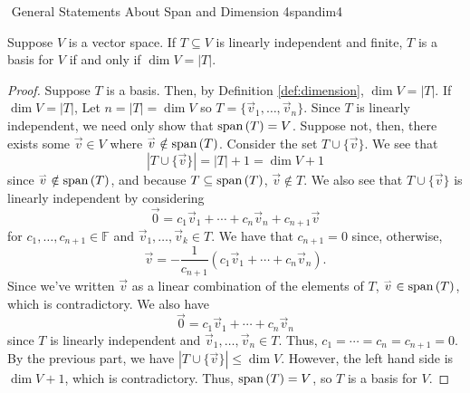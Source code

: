         \begin{theorem}{\Stop\,\,General Statements About Span and Dimension 4}{spandim4}
            
            Suppose \(V\) is a vector space. If \(T\subseteq V\) is linearly independent and finite, \(T\) is a basis for \(V\) if and only if \(\dim V = |T|\).
            \begin{proof}
                Suppose \(T\) is a basis. Then, by Definition \ref{def:dimension}, \(\dim V = |T|\). If \(\dim V = |T|\), Let \(n=|T|=\dim V\) so \(T=\{\vec{v}_1,\ldots,\vec{v}_n\}\). Since \(T\) is linearly independent, we need only show that \(\text{span\,}(T)=V\). Suppose not, then, there exists some \(\vec{v}\in V\) where \(\overset{_{\rightharpoonup}}{v}\notin \text{span\,}(T)\). Consider the set \(T\cup\{\vec{v}\}\). We see that
                \begin{equation*}
                    |T\cup\{\vec{v}\}|=|T|+1=\dim V+1
                \end{equation*}
                since \(\overset{_{\rightharpoonup}}{v}\notin\text{span\,}(T)\), and because \(T\subseteq\text{span\,}(T)\), \(\vec{v}\nin T\). We also see that \(T\cup\{\vec{v}\}\) is linearly independent by considering
                \begin{equation*}
                    \vec{0}=c_1\vec{v}_1+\cdots+c_n\vec{v}_n+c_{n+1}\vec{v}
                \end{equation*}
                for \(c_1,\ldots,c_{n+1}\in\mathbb{F}\) and \(\vec{v}_1,\ldots,\vec{v}_k\in T\). We have that \(c_{n+1}=0\) since, otherwise, 
                \begin{equation*}
                    \vec{v}=-\frac{1}{c_{n+1}}(c_1\vec{v}_1+\cdots+c_n\vec{v}_n).
                \end{equation*}
                Since we've written \(\vec{v}\) as a linear combination of the elements of \(T\), \(\overset{_{\rightharpoonup}}{v}\in\text{span\,}(T)\), which is contradictory. We also have
                \begin{equation*}
                    \vec{0}=c_1\vec{v}_1+\cdots+c_n\vec{v}_n
                \end{equation*}
                since \(T\) is linearly independent and \(\vec{v}_1,\ldots,\vec{v}_n\in T\). Thus, \(c_1=\cdots=c_n=c_{n+1}=0\). By the previous part, we have \(|T\cup\{\vec{v}\}|\leq\dim V\). However, the left hand side is \(\dim V+1\), which is contradictory. Thus, \(\text{span\,}(T)=V\), so \(T\) is a basis for \(V\).
            \end{proof}
        
        \end{theorem}


